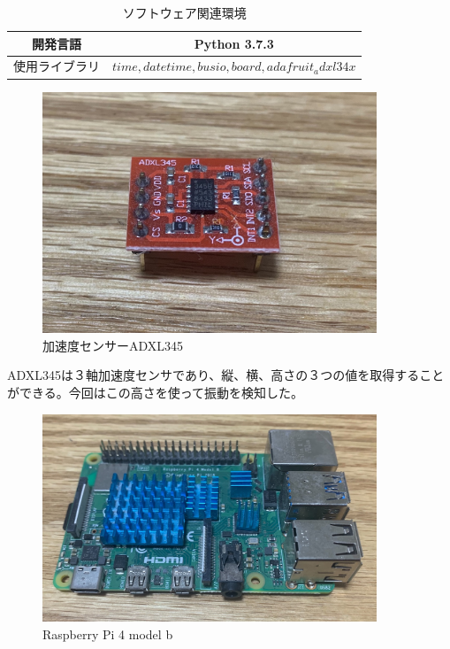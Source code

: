 \begin{table}[htbp]
  \caption{ソフトウェア関連環境}
  \label{tb:meal_detection_spec_sw}
  \begin{center}
    \begin{tabular}{|c||c|}
      \hline
      開発言語 & Python 3.7.3 \\\hline
      使用ライブラリ &  $ time, datetime, busio, board, adafruit_adxl34x $ \\\hline
    \end{tabular}
  \end{center}
\end{table}

\begin{figure}[htbp]
  \caption{加速度センサーADXL345}
  \label{fig:adxl345}
  \begin{center}
    \includegraphics[bb=0 0 1300 1000,width=10cm]{assets/adxl345.jpg}
  \end{center}
\end{figure}

ADXL345は３軸加速度センサであり、縦、横、高さの３つの値を取得することができる。今回はこの高さを使って振動を検知した。

\begin{figure}[htbp]
  \caption{Raspberry Pi 4 model b}
  \label{fig:raspi4_model_b}
  \begin{center}
    \includegraphics[bb=0 0 1300 1100,width=10cm]{assets/raspi4_model_b.jpg}
  \end{center}
\end{figure}

